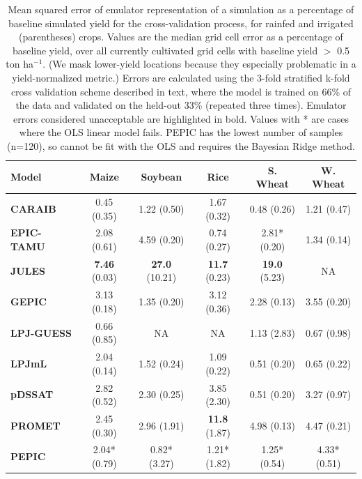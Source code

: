 \documentclass[gmd, manuscript]{copernicus} %
\begin{document}
\begin{table}[ht]
    \caption{
	    Mean squared error of emulator representation of a simulation as a percentage of baseline simulated yield for the cross-validation process, for rainfed and irrigated (parentheses) crops. Values are the median grid cell error as a percentage of baseline yield, over all currently cultivated grid cells with baseline yield $>$ 0.5 ton ha$^{-1}$. (We mask lower-yield locations because they especially problematic in a yield-normalized metric.) %
    Errors are calculated using the 3-fold stratified k-fold cross validation scheme described in text, where the model is trained on 66\% of the data and validated on the held-out 33\% (repeated three times). 
    Emulator errors considered unacceptable are highlighted in bold. 
        Values with * are cases where the OLS linear model fails. PEPIC has the lowest number of samples (n=120), so cannot be fit with the OLS and requires the Bayesian Ridge method.
    } 
    \label{table:ASE}
    \begin{tabular}{l | c | c | c | c | c} 
        \hline
        \textbf{Model}     & \textbf{Maize} & \textbf{Soybean} & \textbf{Rice} & \textbf{S. Wheat} & \textbf{W. Wheat} \\ \hline
        \textbf{CARAIB}    & 0.45 (0.35) & 1.22 (0.50) & 1.67 (0.32) & 0.48 (0.26) & 1.21 (0.47) \\ \hline
        \textbf{EPIC-TAMU} & 2.08 (0.61) & 4.59 (0.20) & 0.74 (0.27) & 2.81* (0.20) & 1.34 (0.14)  \\ \hline
        \textbf{JULES}     & \textbf{7.46} (0.03) & \textbf{27.0} (10.21)& \textbf{11.7} (0.23) & \textbf{19.0} (5.23)  & NA  \\ \hline
        \textbf{GEPIC}     & 3.13 (0.18) & 1.35 (0.20) & 3.12 (0.36) & 2.28 (0.13) & 3.55 (0.20) \\ \hline
        \textbf{LPJ-GUESS} & 0.66 (0.85) & NA    & NA  & 1.13 (2.83) & 0.67 (0.98)  \\ \hline
        \textbf{LPJmL}     & 2.04 (0.14) & 1.52 (0.24) & 1.09 (0.22) & 0.51 (0.20) & 0.65 (0.22)  \\ \hline
        \textbf{pDSSAT}    & 2.82 (0.52) & 2.30 (0.25) & 3.85 (2.30) & 0.51 (0.20) & 3.27 (0.97)  \\ \hline
        \textbf{PROMET}    & 2.45 (0.30) & 2.96 (1.91) & \textbf{11.8} (1.87) & 4.98 (0.13) & 4.47 (0.21)  \\ \hline
        \textbf{PEPIC}     & 2.04* (0.79) & 0.82* (3.27) & 1.21* (1.82) & 1.25* (0.54) & 4.33* (0.51) \\ \hline
    \end{tabular}
\end{table}
\end{document}
